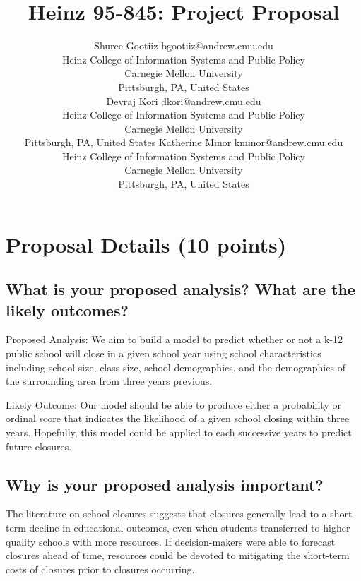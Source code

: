 \documentclass[twoside,11pt]{article}
\begin{document}
\title{Heinz 95-845: Project Proposal}

\author{\name Shuree Gootiiz \email bgootiiz@andrew.cmu.edu \\
       \addr Heinz College of Information Systems and Public Policy\\
       Carnegie Mellon University\\
       Pittsburgh, PA, United States \\
       \AND
       \name Devraj Kori \email dkori@andrew.cmu.edu \\
       \addr Heinz College of Information Systems and Public Policy\\
       Carnegie Mellon University\\
       Pittsburgh, PA, United States
       \AND
       \name Katherine Minor \email kminor@andrew.cmu.edu \\
       \addr Heinz College of Information Systems and Public Policy\\
       Carnegie Mellon University\\
       Pittsburgh, PA, United States}
       
\maketitle



\section{Proposal Details (10 points)} \label{details}

\subsection{What is your proposed analysis? What are the likely outcomes?}

Proposed Analysis: We aim to build a model to predict whether or not a k-12 public school will close in a given school year using school characteristics including school size, class size, school demographics, and the demographics of the surrounding area from three years previous.

Likely Outcome: Our model should be able to produce either a probability or ordinal score that indicates the likelihood of a given school closing within three years. Hopefully, this model could be applied to each successive years to predict future closures.


\subsection{Why is your proposed analysis important?}
The literature on school closures suggests that closures generally lead to a short-term decline in educational outcomes, even when students transferred to higher quality schools with more resources. If decision-makers were able to forecast closures ahead of time, resources could be devoted to mitigating the short-term costs of closures prior to closures occurring.
\end{document}
